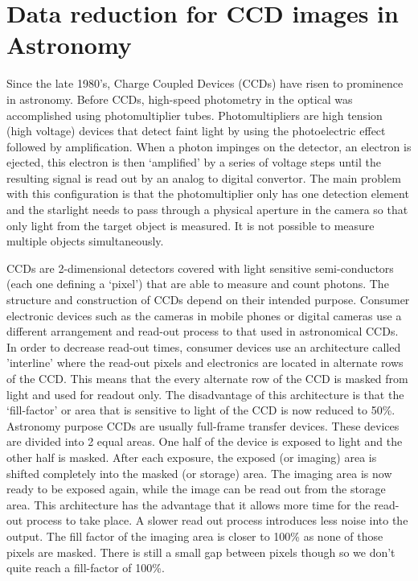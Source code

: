 \section{Data reduction for CCD images in Astronomy}
Since the late 1980's, Charge Coupled Devices (CCDs) have risen to prominence in astronomy. Before CCDs, high-speed photometry in the optical was accomplished using photomultiplier tubes. Photomultipliers are high tension (high voltage) devices that detect faint light by using the photoelectric effect followed by amplification. When a photon impinges on the detector, an electron is ejected, this electron is then `amplified' by a series of voltage steps until the resulting signal is read out by an analog to digital convertor. The main problem with this configuration is that the photomultiplier only has one detection element and the starlight needs to pass through a physical aperture in the camera so that only light from the target object is measured. It is not possible to measure multiple objects simultaneously. 

CCDs are 2-dimensional detectors covered with light sensitive semi-conductors (each one defining a `pixel') that are able to measure and count photons. The structure and construction of CCDs depend on their intended purpose. Consumer electronic devices such as the cameras in mobile phones or digital cameras use a different arrangement and read-out process to that used in astronomical CCDs. In order to decrease read-out times, consumer devices use an architecture called 'interline' where the read-out pixels and electronics are located in alternate rows of the CCD. This means that the every alternate row of the CCD is masked from light and used for readout only. The disadvantage of this architecture is that the `fill-factor' or area that is sensitive to light of the CCD is now reduced to 50\%. Astronomy purpose CCDs are usually full-frame transfer devices. These devices are divided into 2 equal areas. One half of the device is exposed to light and the other half is masked. After each exposure, the exposed (or imaging) area is shifted completely into the masked (or storage) area. The imaging area is now ready to be exposed again, while the image can be read out from the storage area. This architecture has the advantage that it allows more time for the read-out process to take place. A slower read out process introduces less noise into the output. The fill factor of the imaging area is closer to 100\% as none of those pixels are masked. There is still a small gap between pixels though so we don't quite reach a fill-factor of 100\%. 


